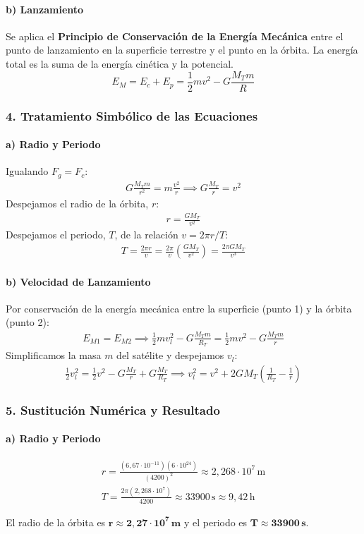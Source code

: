 \paragraph{b) Lanzamiento}
Se aplica el \textbf{Principio de Conservación de la Energía Mecánica} entre el punto de lanzamiento en la superficie terrestre y el punto en la órbita. La energía total es la suma de la energía cinética y la potencial.
$$ E_M = E_c + E_p = \frac{1}{2}mv^2 - G\frac{M_T m}{R} $$
\subsubsection*{4. Tratamiento Simbólico de las Ecuaciones}
\paragraph{a) Radio y Periodo}
Igualando $F_g = F_c$:
\begin{gather}
    G \frac{M_T m}{r^2} = m \frac{v^2}{r} \implies G \frac{M_T}{r} = v^2
\end{gather}
Despejamos el radio de la órbita, $r$:
\begin{gather}
    r = \frac{G M_T}{v^2}
\end{gather}
Despejamos el periodo, $T$, de la relación $v = 2\pi r/T$:
\begin{gather}
    T = \frac{2\pi r}{v} = \frac{2\pi}{v} \left( \frac{G M_T}{v^2} \right) = \frac{2\pi G M_T}{v^3}
\end{gather}
\paragraph{b) Velocidad de Lanzamiento}
Por conservación de la energía mecánica entre la superficie (punto 1) y la órbita (punto 2):
\begin{gather}
    E_{M1} = E_{M2} \implies \frac{1}{2}mv_l^2 - G\frac{M_T m}{R_T} = \frac{1}{2}mv^2 - G\frac{M_T m}{r}
\end{gather}
Simplificamos la masa $m$ del satélite y despejamos $v_l$:
\begin{gather}
    \frac{1}{2}v_l^2 = \frac{1}{2}v^2 - G\frac{M_T}{r} + G\frac{M_T}{R_T} \implies v_l^2 = v^2 + 2GM_T\left(\frac{1}{R_T} - \frac{1}{r}\right)
\end{gather}
\subsubsection*{5. Sustitución Numérica y Resultado}
\paragraph{a) Radio y Periodo}
\begin{gather}
    r = \frac{(6,67\cdot10^{-11})(6\cdot10^{24})}{(4200)^2} \approx 2,268 \cdot 10^7 \, \text{m} \\
    T = \frac{2\pi (2,268 \cdot 10^7)}{4200} \approx 33900 \, \text{s} \approx 9,42 \, \text{h}
\end{gather}
\begin{cajaresultado}
El radio de la órbita es $\boldsymbol{r \approx 2,27 \cdot 10^7 \, \textbf{m}}$ y el periodo es $\boldsymbol{T \approx 33900 \, \textbf{s}}$.
\end{cajaresultado}
